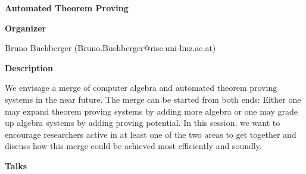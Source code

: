 \begin{center}
{\LARGE \bf Automated Theorem Proving}
\end{center}
\bigskip

{\bf Organizer}

\medskip
Bruno Buchberger (Bruno.Buchberger@risc.uni-linz.ac.at)
\bigskip

{\bf Description}
\medskip

We envisage a merge of computer algebra and automated theorem proving systems in the near
future. The merge can be started from both ends: Either one may expand theorem proving systems
by adding more algebra or one may grade up algebra systems by adding proving potential. In this
session, we want to encourage researchers active in at least one of the two areas to get together and
discuss how this merge could be achieved most efficiently and soundly. 

\bigskip
{\bf Talks}
\medskip

